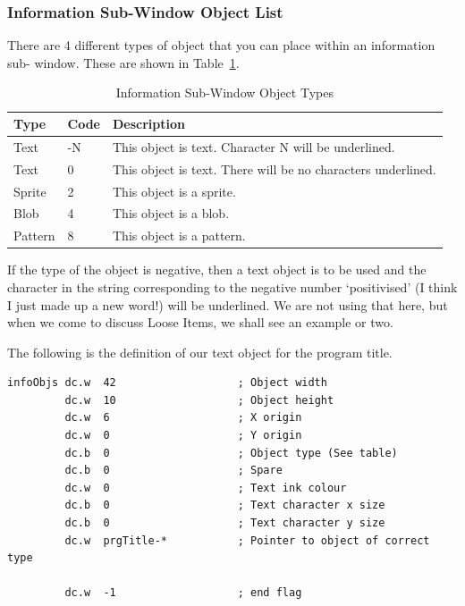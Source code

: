 \subsubsection{Information Sub-{}Window Object List}
\label{ch23-info-objects}%

There are 4 different types of object that you can place within an information sub-{}
window. These are shown in Table~\ref{tab:InfoSubWindowObjectTypes}.

\begin{table}[htbp]
\centering
\begin{tabular}{l l p{}}
\toprule
\textbf{Type} & \textbf{Code} & \textbf{Description} \\
\midrule
Text    &-N & This object is text. Character N will be underlined. \\
Text    & 0 & This object is text. There will be no characters underlined.\\
Sprite  & 2 & This object is a sprite.\\
Blob    & 4 & This object is a blob.\\
Pattern & 8 & This object is a pattern.\\
%
\bottomrule
\end{tabular}
\caption{Information Sub-Window Object Types}
\label{tab:InfoSubWindowObjectTypes}
\end{table}


If the type of the object is negative, then a text object is to be used and the
character in the string corresponding to the negative number `positivised' (I think I just
made up a new word!) will be underlined. We are not using that here, but when we come to
discuss Loose Items, we shall see an example or two.

The following is the definition of our text object for the program title.

\begin{lstlisting}[firstnumber=last,caption={WMAN Example Window - Information Object}]
infoObjs dc.w  42                   ; Object width
         dc.w  10                   ; Object height
         dc.w  6                    ; X origin
         dc.w  0                    ; Y origin
         dc.b  0                    ; Object type (See table)
         dc.b  0                    ; Spare
         dc.w  0                    ; Text ink colour
         dc.b  0                    ; Text character x size
         dc.b  0                    ; Text character y size
         dc.w  prgTitle-*           ; Pointer to object of correct type

         dc.w  -1                   ; end flag
\end{lstlisting}

